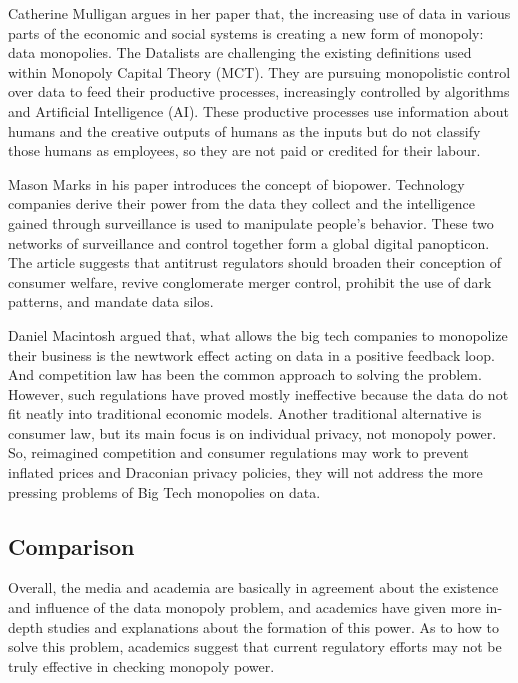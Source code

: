 \documentclass[11pt]{article}
\begin{document}
Catherine Mulligan argues in her paper\cite{mulligan2023datalism} that, the increasing use of data in various parts of the economic and social systems is creating a new form of monopoly: data monopolies. The Datalists are challenging the existing definitions used within Monopoly Capital Theory (MCT). They are pursuing monopolistic control over data to feed their productive processes, increasingly controlled by algorithms and Artificial Intelligence (AI). These productive processes use information about humans and the creative outputs of humans as the inputs but do not classify those humans as employees, so they are not paid or credited for their labour.

Mason Marks in his paper\cite{marks2021biosupremacy} introduces the concept of biopower. Technology companies derive their power from the data they collect and the intelligence gained through surveillance is used to manipulate people's behavior. These two networks of surveillance and control together form a global digital panopticon. The article suggests that antitrust regulators should broaden their conception of consumer welfare, revive conglomerate merger control, prohibit the use of dark patterns, and mandate data silos.

Daniel Macintosh argued that, what allows the big tech companies to monopolize their business is the newtwork effect acting on data in a positive feedback loop. And competition law has been the common approach to solving the problem. However, such regulations have proved mostly ineffective because the data do not fit neatly into traditional economic models. Another traditional alternative is consumer law, but its main focus is on individual privacy, not monopoly power. So, reimagined competition and consumer regulations may work to prevent inflated prices and Draconian privacy policies, they will not address the more pressing problems of Big Tech monopolies on data.\cite{mcintosh2018we}

\subsection{Comparison}

Overall, the media and academia are basically in agreement about the existence and influence of the data monopoly problem, and academics have given more in-depth studies and explanations about the formation of this power. As to how to solve this problem, academics suggest that current regulatory efforts may not be truly effective in checking monopoly power.
\end{document}

